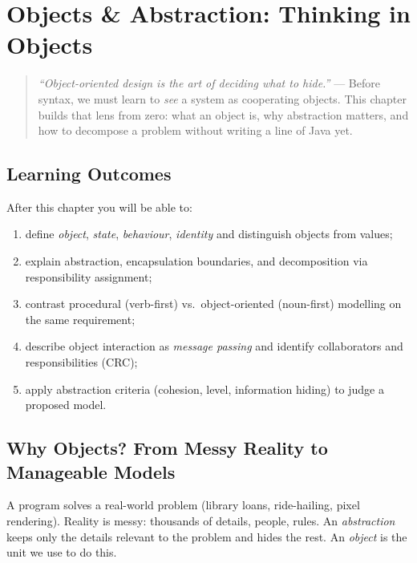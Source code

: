 \chapter{Objects \& Abstraction: Thinking in Objects}
\label{ch:objects}

\begin{quote}
\emph{``Object-oriented design is the art of deciding what to hide.''} --- Before syntax, we must learn to \emph{see} a system as cooperating objects. This chapter builds that lens from zero: what an object is, why abstraction matters, and how to decompose a problem without writing a line of Java yet.
\end{quote}

\noindent{}

\section*{Learning Outcomes}
After this chapter you will be able to:
\begin{enumerate}[label=(L\arabic*)]
    \item define \emph{object}, \emph{state}, \emph{behaviour}, \emph{identity} and distinguish objects from values;
    \item explain abstraction, encapsulation boundaries, and decomposition via responsibility assignment;
    \item contrast procedural (verb-first) vs.\ object-oriented (noun-first) modelling on the same requirement;
    \item describe object interaction as \emph{message passing} and identify collaborators and responsibilities (CRC);
    \item apply abstraction criteria (cohesion, level, information hiding) to judge a proposed model.
\end{enumerate}

\section{Why Objects? From Messy Reality to Manageable Models}
\label{sec:why-objects}
A program solves a real-world problem (library loans, ride-hailing, pixel rendering). Reality is messy: thousands of details, people, rules. An \emph{abstraction} keeps only the details relevant to the problem and hides the rest. An \emph{object} is the unit we use to do this.

